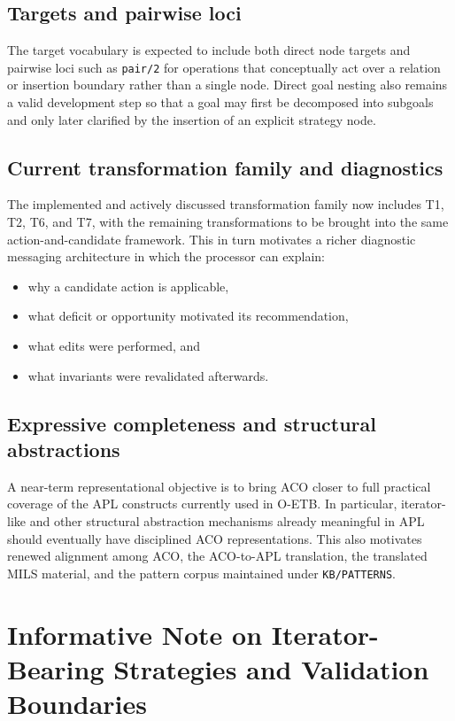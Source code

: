 \documentclass[11pt,twoside,a4paper]{article}
\begin{document}
\subsection{Targets and pairwise loci}

The target vocabulary is expected to include both direct node targets and pairwise loci such as \texttt{pair/2} for operations that conceptually act over a relation or insertion boundary rather than a single node.
Direct goal nesting also remains a valid development step so that a goal may first be decomposed into subgoals and only later clarified by the insertion of an explicit strategy node.

\subsection{Current transformation family and diagnostics}

The implemented and actively discussed transformation family now includes T1, T2, T6, and T7, with the remaining transformations to be brought into the same action-and-candidate framework.
This in turn motivates a richer diagnostic messaging architecture in which the processor can explain:
\begin{itemize}[leftmargin=2em]
  \item why a candidate action is applicable,
  \item what deficit or opportunity motivated its recommendation,
  \item what edits were performed, and
  \item what invariants were revalidated afterwards.
\end{itemize}

\subsection{Expressive completeness and structural abstractions}

A near-term representational objective is to bring ACO closer to full practical coverage of the APL constructs currently used in O-ETB.
In particular, iterator-like and other structural abstraction mechanisms already meaningful in APL should eventually have disciplined ACO representations.
This also motivates renewed alignment among ACO, the ACO-to-APL translation, the translated MILS material, and the pattern corpus maintained under \texttt{KB/PATTERNS}.

\clearpage
\section{Informative Note on Iterator-Bearing Strategies and Validation Boundaries}
\label{sec:iterator-bearing-strategies}
\end{document}

